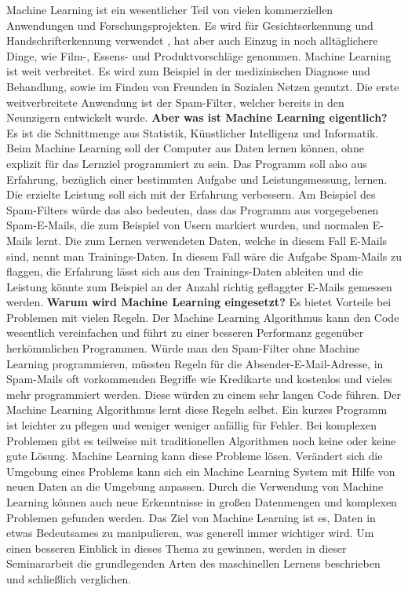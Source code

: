 Machine Learning ist ein wesentlicher Teil von vielen kommerziellen Anwendungen und Forschungsprojekten. \cite{Mueller2016} Es wird für Gesichtserkennung und Handschrifterkennung verwendet \cite{Kirk2014}, hat aber auch Einzug in noch alltäglichere Dinge, wie Film-, Essens- und Produktvorschläge genommen. Machine Learning ist weit verbreitet. Es wird zum Beispiel in der medizinischen Diagnose und Behandlung, sowie im Finden von Freunden in Sozialen Netzen genutzt. \cite{Mueller2016} Die erste weitverbreitete Anwendung ist der Spam-Filter, welcher bereits in den Neunzigern entwickelt wurde. \cite{Geron2017}\newline
	\textbf{Aber was ist Machine Learning eigentlich?}\newline
	Es ist die Schnittmenge aus Statistik, Künstlicher Intelligenz und Informatik. \cite{Mueller2016} Beim Machine Learning soll der Computer aus Daten lernen können, ohne explizit für das Lernziel programmiert zu sein. Das Programm soll also aus Erfahrung, bezüglich einer bestimmten Aufgabe und Leistungsmessung, lernen. Die erzielte Leistung soll sich mit der Erfahrung verbessern.
	Am Beispiel des Spam-Filters würde das also bedeuten, dass das Programm aus vorgegebenen Spam-E-Mails, die zum Beispiel von Usern markiert wurden, und normalen E-Mails lernt. Die zum Lernen verwendeten Daten, welche in diesem Fall E-Mails sind, nennt man Trainings-Daten. In diesem Fall wäre die Aufgabe Spam-Mails zu flaggen, die Erfahrung lässt sich aus den Trainings-Daten ableiten und die Leistung könnte zum Beispiel an der Anzahl richtig geflaggter E-Mails gemessen werden. \cite{Geron2017} \newline
	\textbf{Warum wird Machine Learning eingesetzt?}\newline
	Es bietet Vorteile bei Problemen mit vielen Regeln. Der Machine Learning Algorithmus kann den Code wesentlich vereinfachen und führt zu einer besseren Performanz gegenüber herkömmlichen Programmen. Würde man den Spam-Filter ohne Machine Learning programmieren, müssten Regeln für die  Absender-E-Mail-Adresse, in Spam-Mails oft vorkommenden Begriffe wie Kredikarte und kostenlos und vieles mehr programmiert werden. Diese würden zu einem sehr langen Code führen. Der Machine Learning Algorithmus lernt diese Regeln selbst. Ein kurzes Programm ist leichter zu pflegen und weniger weniger anfällig für Fehler.\newline
	Bei komplexen Problemen gibt es teilweise mit traditionellen Algorithmen noch keine oder keine gute Lösung. Machine Learning kann diese Probleme lösen.\newline
	Verändert sich die Umgebung eines Problems kann sich ein Machine Learning System mit Hilfe von neuen Daten an die Umgebung anpassen.\newline
	Durch die Verwendung von Machine Learning können auch neue Erkenntnisse in großen Datenmengen und komplexen Problemen gefunden werden. \cite{Geron2017}\newline
	Das Ziel von Machine Learning ist es, Daten in etwas Bedeutsames zu manipulieren, was generell immer wichtiger wird. \cite{Kirk2014} Um einen besseren Einblick in dieses Thema zu gewinnen, werden in dieser Seminararbeit die grundlegenden Arten des maschinellen Lernens beschrieben und schließlich verglichen.